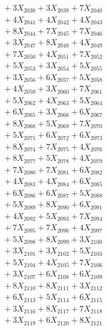 \documentclass[a4paper,10pt]{article}
\begin{document}
{\begin{align}
&\;  + 3 X_{2038} + 3 X_{2039} + 7 X_{2040} \\[0.3ex]
&\;  + 4 X_{2041} + 4 X_{2042} + 4 X_{2043} \\[0.3ex]
&\;  + 8 X_{2044} + 7 X_{2045} + 7 X_{2046} \\[0.3ex]
&\;  + 3 X_{2047} + 8 X_{2048} + 4 X_{2049} \\[0.5ex]\allowbreak
&\;  + 7 X_{2050} + 4 X_{2051} + 7 X_{2052} \\[0.3ex]
&\;  + 5 X_{2053} + 3 X_{2054} + 5 X_{2055} \\[0.3ex]
&\;  + 3 X_{2056} + 6 X_{2057} + 5 X_{2058} \\[0.3ex]
&\;  + 4 X_{2059} + 3 X_{2060} + 7 X_{2061} \\[0.3ex]
&\;  + 5 X_{2062} + 4 X_{2063} + 5 X_{2064} \\[0.3ex]
&\;  + 6 X_{2065} + 3 X_{2066} + 6 X_{2067} \\[0.3ex]
&\;  + 8 X_{2068} + 5 X_{2069} + 7 X_{2070} \\[0.3ex]
&\;  + 5 X_{2071} + 6 X_{2072} + 6 X_{2073} \\[0.3ex]
&\;  + 8 X_{2074} + 7 X_{2075} + 4 X_{2076} \\[0.3ex]
&\;  + 8 X_{2077} + 5 X_{2078} + 4 X_{2079} \\[0.5ex]\allowbreak
&\;  + 7 X_{2080} + 7 X_{2081} + 6 X_{2082} \\[0.3ex]
&\;  + 4 X_{2083} + 4 X_{2084} + 6 X_{2085} \\[0.3ex]
&\;  + 6 X_{2086} + 6 X_{2087} + 5 X_{2088} \\[0.3ex]
&\;  + 5 X_{2089} + 8 X_{2090} + 6 X_{2091} \\[0.3ex]
&\;  + 4 X_{2092} + 5 X_{2093} + 7 X_{2094} \\[0.3ex]
&\;  + 7 X_{2095} + 7 X_{2096} + 4 X_{2097} \\[0.3ex]
&\;  + 5 X_{2098} + 8 X_{2099} + 3 X_{2100} \\[0.3ex]
&\;  + 3 X_{2101} + 3 X_{2102} + 5 X_{2103} \\[0.3ex]
&\;  + 5 X_{2104} + 4 X_{2105} + 7 X_{2106} \\[0.3ex]
&\;  + 3 X_{2107} + 6 X_{2108} + 6 X_{2109} \\[0.5ex]\allowbreak
&\;  + 8 X_{2110} + 8 X_{2111} + 3 X_{2112} \\[0.3ex]
&\;  + 6 X_{2113} + 5 X_{2114} + 6 X_{2115} \\[0.3ex]
&\;  + 3 X_{2116} + 8 X_{2117} + 7 X_{2118} \\[0.3ex]
&\;  + 3 X_{2119} + 6 X_{2120} + 8 X_{2121} \\[0.3ex]

\end{align}}
\end{document}

